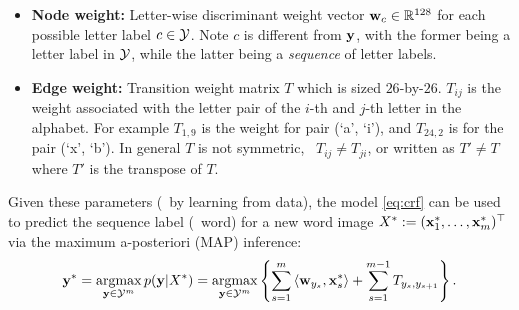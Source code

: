 \documentclass[11pt]{report}
\begin{document}
	\vspace{-1em}
	\begin{itemize}
		\item {\bf Node weight:} Letter-wise discriminant weight vector $\mathbf{\boldsymbol{w}}_c \in \mathbb{R}^{128}$ for each possible letter label $c \in \mathcal{Y}$.
		Note $c$ is different from $\mathbf{\boldsymbol{y}}$,
		with the former being a letter label in $\mathcal{Y}$,
		while the latter being a \textit{sequence} of letter labels.
		\item {\bf Edge weight:} Transition weight matrix $T$ which is sized $26$-by-$26$.
		$T_{ij}$ is the weight associated with the letter pair of the $i$-th and $j$-th letter in the alphabet.  For example $T_{1,9}$ is the weight for pair (`a', `i'), and $T_{24,2}$ is for the pair (`x', `b'). In general $T$ is not symmetric, \ie\ $T_{ij} \neq T_{ji}$, or written as $T' \neq T$ where $T'$ is the transpose of $T$.
	\end{itemize}
	
	Given these parameters (\eg\ by learning from data), the model \eqref{eq:crf} can be used to predict the sequence label (\ie\ word) for a new word image $X^* := (\mathbf{\boldsymbol{x}}^*_1, \ldots, \mathbf{\boldsymbol{x}}^*_m)^\top$ via the maximum a-posteriori (MAP) inference:
	\begin{align}
		\label{eq:crf_decode}
		\mathbf{\boldsymbol{y}}^* = \operatorname*{\mathrm{argmax}}_{\mathbf{\boldsymbol{y}} \in \mathcal{Y}^m} p(\mathbf{\boldsymbol{y}} | X^*)
		= \operatorname*{\mathrm{argmax}}_{\mathbf{\boldsymbol{y}} \in \mathcal{Y}^m} \left\{ \sum_{s=1}^m \left\langle \mathbf{\boldsymbol{w}}_{y_s},\mathbf{\boldsymbol{x}}^*_s \right\rangle + \sum_{s=1}^{m-1} T_{y_s, y_{s+1}}\right\}.
	\end{align}
	
	
	
\end{document}
